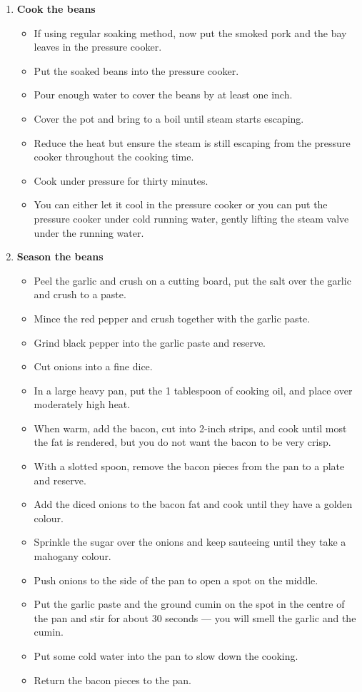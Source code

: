 \documentclass[11pt,letterpaper]{article}
\begin{document}
\begin{description}
\begin{enumerate}
	\item {\bf Cook the beans}
	\begin{itemize}
	\item If using regular soaking method, now put the smoked pork and the bay leaves in the pressure cooker.
	\item Put the soaked beans into the pressure cooker.
	\item Pour enough water to cover the beans by at least one inch.
	\item Cover the pot and bring to a boil until steam starts escaping.
	\item Reduce the heat but ensure the steam is still escaping from the pressure cooker throughout the cooking time.
	\item Cook under pressure for thirty minutes. 
	\item You can either let it cool in the pressure cooker or you can put the pressure cooker under cold  running water, gently lifting the steam valve under the running water.
	\end{itemize}
	
	\item {\bf Season the beans}
	\begin{itemize}
	\item Peel the garlic and crush on a cutting board, put the salt over the garlic and crush to a paste. 
	\item Mince the red pepper and crush together with the garlic paste.
	\item Grind black pepper into the garlic paste and reserve.
	\item Cut onions into a fine dice.
	\item In a large heavy pan, put the 1 tablespoon of cooking oil, and place over moderately high heat.
	\item When warm, add the bacon, cut into 2-inch strips, and cook until most the fat is rendered, but you do not want the bacon to be very crisp.
	\item With a slotted spoon, remove the bacon pieces from the pan to a plate and reserve.
	\item Add the diced onions to the bacon fat and cook until they have a golden colour.
	\item Sprinkle the sugar over the onions and keep sauteeing until they take a mahogany colour.
	\item Push onions to the side of the pan to open a spot on the middle.
	\item Put the garlic paste and the ground cumin on the spot in the centre of the pan and stir for about 30 seconds --- you will smell the garlic and the cumin.
	\item Put some cold water into the pan to slow down the cooking.
	\item Return the bacon pieces to the pan.
	\end{itemize}	
	

\end{enumerate}
\end{description}
\end{document}
